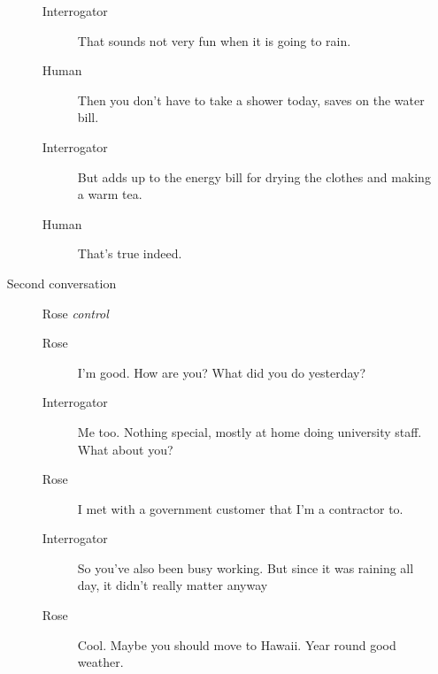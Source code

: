 \begin{itemize}
\begin{description}
\begin{description}
               \item [Interrogator] That sounds not very fun when it is going to rain.
               \item [Human] Then you don't have to take a shower today, saves on the water bill.
               \item [Interrogator] But adds up to the energy bill for drying the clothes and making a warm tea.
               \item [Human] That's true indeed.
            \end{description}
         \item [Second conversation] Rose \textit{control}
\begin{description}
         \item [Rose] I'm good. How are you? What did you do yesterday?
         \item [Interrogator] Me too. Nothing special, mostly at home doing university staff. What about you?
         \item [Rose] I met with a government customer that I'm a contractor to.
         \item [Interrogator] So you've also been busy working. But since it was raining all day, it didn't really matter anyway
         \item [Rose] Cool. Maybe you should move to Hawaii. Year round good weather.
            \end{description}
      \end{description}


\end{itemize}
